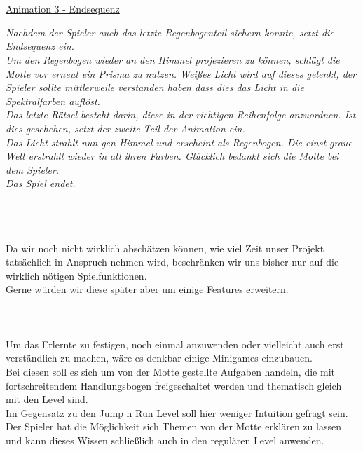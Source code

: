 \documentclass[10pt,a4paper,notitlepage]{report}
\begin{document}
	\\\\
	\underline{Animation 3 - Endsequenz}\
	\\
	\begin{flushright}
	\textit{Nachdem der Spieler auch das letzte Regenbogenteil sichern konnte,
	setzt die Endsequenz ein.\\
	Um den Regenbogen wieder an den Himmel projezieren zu können,
	schlägt die Motte vor erneut ein Prisma zu nutzen.
	Weißes Licht wird auf dieses gelenkt, der Spieler sollte mittlerweile
	verstanden haben dass dies das Licht in die Spektralfarben auflöst.\\
	Das letzte Rätsel besteht darin, diese in der richtigen Reihenfolge anzuordnen.
	Ist dies geschehen, setzt der zweite Teil der Animation ein.\\
	Das Licht strahlt nun gen Himmel und erscheint als Regenbogen.
	Die einst graue Welt erstrahlt wieder in all ihren Farben.
	Glücklich bedankt sich die Motte bei dem Spieler.\\
	Das Spiel endet.}
	\end{flushright}\
	\clearpage\
	\marginpar{\vspace{3.0mm} \color{orange}\rule{0.8mm}{53.3mm} \\[3mm] \color{hellorange}\rule{0.8mm}{170mm}}
	\\
	\
	\\\\
	\Text
		Da wir noch nicht wirklich abschätzen können, wie viel Zeit unser Projekt tatsächlich in Anspruch nehmen wird, 
	beschränken wir uns bisher nur auf die wirklich nötigen Spielfunktionen. \\
	Gerne würden wir diese später aber um einige Features erweitern.
	\\\\
	\Drei{3.1. Minigames}\
	\\\\
	\Text
		Um das Erlernte zu festigen, noch einmal anzuwenden oder vielleicht auch erst verständlich zu machen, wäre es denkbar einige Minigames einzubauen.\\ 
	Bei diesen soll es sich um von der Motte gestellte Aufgaben handeln, die mit fortschreitendem Handlungsbogen freigeschaltet werden 
	und thematisch gleich mit den Level sind.\\
	Im Gegensatz zu den Jump n Run Level soll hier weniger Intuition gefragt sein. Der Spieler hat die Möglichkeit sich Themen von der Motte 
	erklären zu lassen und kann dieses Wissen schließlich auch in den regulären Level anwenden.\\
\end{document}
